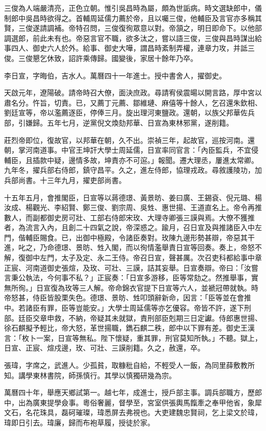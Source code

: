 \begin{pinyinscope}
三俊為人端嚴清亮，正色立朝。惟引吳昌時為屬，頗為世詬病。時文選缺郎中，儀制郎中吳昌時欲得之。首輔周延儒力薦於帝，且以囑三俊，他輔臣及言官亦多稱其賢，三俊遂請調補。帝特召問，三俊復徇眾意以對。帝頷之，明日即命下。以他部調選郎，前此未有也。帝惡言官不職，欲多汰之，嘗以語三俊，三俊與昌時謀出給事四人、御史六人於外。給事、御史大嘩，謂昌時紊制弄權，連章力攻，并詆三俊。三俊懇乞休致，詔許乘傳歸。國變後，家居十餘年乃卒。

李日宣，字晦伯，吉水人。萬曆四十一年進士。授中書舍人，擢御史。

天啟元年，遼陽破。請帝時召大僚，面決庶政。尋請宥侯震暘以開言路，厚中宮以肅名分。忤旨，切責。已，又薦丁元薦、鄒維璉、麻僖等十餘人，乞召還朱欽相、劉廷宣等，帝以濫薦逐臣，停俸三月。旋出理河東鹽政。還朝，以族父邦華佐兵部，引嫌歸。五年七月，逆黨倪文煥劾邦華、日宣為東林邪黨，遂削籍。

莊烈帝即位，復故官，以邦華在朝，久不出。崇禎三年，起故官，巡按河南。還朝，掌河南道事。中官王坤訐大學士周延儒，日宣率同官言：「內臣監兵，不宜侵輔臣，且插款中疑，邊情多故，坤責亦不可逭。」報聞。遷大理丞，屢進太常卿。九年冬，擢兵部右侍郎，鎮守昌平。久之，進左侍郎，協理戎政。尋敘護陵功，加兵部尚書。十三年九月，擢吏部尚書。

十五年五月，會推閣臣，日宣等以蔣德璟、黃景昉、姜曰廣、王錫袞、倪元璐、楊汝成、楊觀光、李紹賢、鄭三俊、劉宗周、吳甡、惠世揚、王道直名上。帝令再推數人，而副都御史房可壯、工部右侍郎宋玫、大理寺卿張三謨與焉。大僚不獲推者，為流言入內，且創二十四氣之說，帝深惑之。踰月，召日宣及與推諸臣入中左門，偕輔臣賜食。已，出御中極殿，令諸臣奏對。玫陳九邊形勢甚辯，帝惡其干進，叱之，乃命德璟、景昉、甡入閣，而以徇情濫舉責日宣等回奏。奏上，帝怒不解，復御中左門，太子及定、永二王侍。帝召日宣，聲甚厲。次召吏科都給事中章正宸、河南道御史張煊，及玫、可壯、三謨，詰其妄舉。日宣奏辯。帝曰：「汝嘗言秉公執法，今何事不私？」正宸奏：「日宣多游移，臣等常劾之。然推舉事，實無所徇。」日宣復為玫等三人解。帝命錦衣官提下日宣等六人，並褫冠帶就執。時帝怒甚，侍臣皆股栗失色。德璟、景昉、甡叩頭辭新命，因言：「臣等並在會推中。若諸臣有罪，臣等豈能安。」大學士周延儒等亦乞優容。帝皆不許，遂下刑部。廷臣交章申救，不納，帝疑其未就獄，責刑部臣剋期三日定讞。侍郎惠世揚、徐石麒擬予輕比，帝大怒，革世揚職，鐫石麒二秩，郎中以下罪有差。御史王漢言：「枚卜一案，日宣等無私。陛下懷疑，重其罪，刑官莫知所執。」不聽。獄上，日宣、正宸、煊戍邊，玫、可壯、三謨削籍。久之，赦還，卒。

張瑋，字席之，武進人。少孤貧，取糠秕自給，不輕受人一飯，為同里薛敷教所知。講學東林書院，師孫慎行。其學以慎獨研幾為宗。

萬曆四十年，舉應天鄉試第一。越七年，成進士，授戶部主事。調兵部職方，歷郎中，出為廣東提學僉事。粵俗奢麗，督學至，宮室供張輿馬餼牽之奉甲他省，象犀文石，名花珠具，磊砢璀璨，瑋悉屏去弗視也。大吏建魏忠賢祠，乞上梁文於瑋，瑋即日引去。瑋廉，歸而布袍草履，授徒於家。


\end{pinyinscope}
